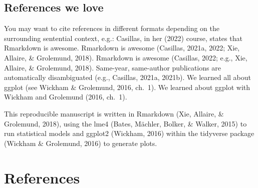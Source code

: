\documentclass[
  english,
  man,floatsintext]{apa6}
\begin{document}
\hypertarget{references-we-love}{%
\subsection{References we love}\label{references-we-love}}

You may want to cite references in different formats depending on the surrounding sentential context, e.g.: Casillas, in her (2022) course, states that Rmarkdown is awesome. Rmarkdown is awesome (Casillas, 2021a, 2022; Xie, Allaire, \& Grolemund, 2018). Rmarkdown is awesome (Casillas, 2022; e.g., Xie, Allaire, \& Grolemund, 2018). Same-year, same-author publications are automatically disambiguated (e.g., Casillas, 2021a, 2021b). We learned all about ggplot (see Wickham \& Grolemund, 2016, ch.~1). We learned about ggplot with Wickham and Grolemund (2016, ch.~1).

This reproducible manuscript is written in Rmarkdown (Xie, Allaire, \& Grolemund, 2018), using the lme4 (Bates, Mächler, Bolker, \& Walker, 2015) to run statistical models and ggplot2 (Wickham, 2016) within the tidyverse package (Wickham \& Grolemund, 2016) to generate plots.

\newpage

\hypertarget{references}{%
\section{References}\label{references}}

\begingroup
\setlength{\parindent}{-0.5in}
\setlength{\leftskip}{0.5in}
\end{document}
